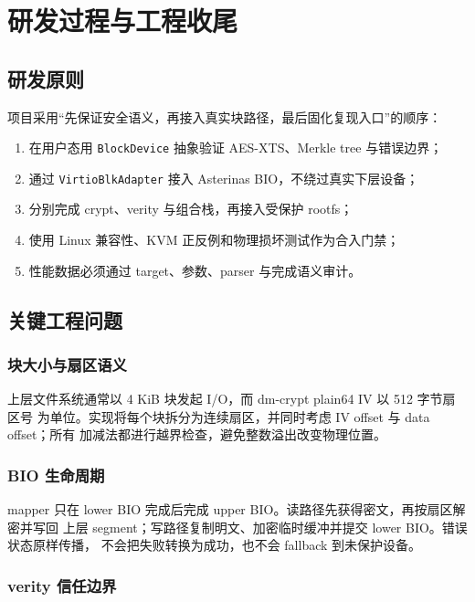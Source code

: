 \chapter{研发过程与工程收尾}

\section{研发原则}

项目采用“先保证安全语义，再接入真实块路径，最后固化复现入口”的顺序：

\begin{enumerate}
    \item 在用户态用 \texttt{BlockDevice} 抽象验证 AES-XTS、Merkle tree 与错误边界；
    \item 通过 \texttt{Virtio\allowbreak Blk\allowbreak Adapter} 接入 Asterinas BIO，不绕过真实下层设备；
    \item 分别完成 crypt、verity 与组合栈，再接入受保护 rootfs；
    \item 使用 Linux 兼容性、KVM 正反例和物理损坏测试作为合入门禁；
    \item 性能数据必须通过 target、参数、parser 与完成语义审计。
\end{enumerate}

\section{关键工程问题}

\subsection{块大小与扇区语义}

上层文件系统通常以 4 KiB 块发起 I/O，而 dm-crypt plain64 IV 以 512 字节扇区号
为单位。实现将每个块拆分为连续扇区，并同时考虑 IV offset 与 data offset；所有
加减法都进行越界检查，避免整数溢出改变物理位置。

\subsection{BIO 生命周期}

mapper 只在 lower BIO 完成后完成 upper BIO。读路径先获得密文，再按扇区解密并写回
上层 segment；写路径复制明文、加密临时缓冲并提交 lower BIO。错误状态原样传播，
不会把失败转换为成功，也不会 fallback 到未保护设备。

\subsection{verity 信任边界}

